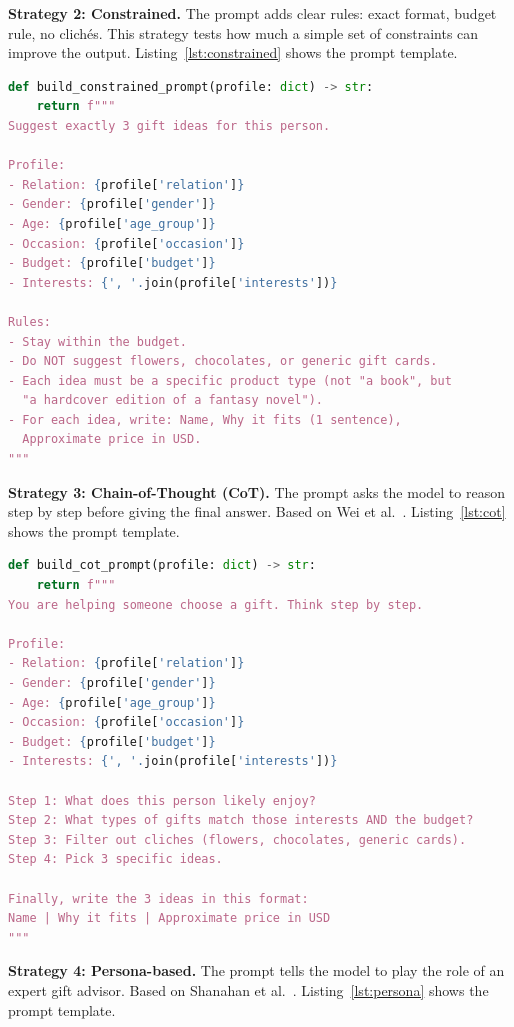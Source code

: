 \textbf{Strategy 2: Constrained.} The prompt adds clear rules: exact format, budget rule, no clichés. This strategy tests how much a simple set of constraints can improve the output. Listing~\ref{lst:constrained} shows the prompt template.

\begin{lstlisting}[language=Python, caption={Constrained prompt template.}, label={lst:constrained}]
def build_constrained_prompt(profile: dict) -> str:
    return f"""
Suggest exactly 3 gift ideas for this person.

Profile:
- Relation: {profile['relation']}
- Gender: {profile['gender']}
- Age: {profile['age_group']}
- Occasion: {profile['occasion']}
- Budget: {profile['budget']}
- Interests: {', '.join(profile['interests'])}

Rules:
- Stay within the budget.
- Do NOT suggest flowers, chocolates, or generic gift cards.
- Each idea must be a specific product type (not "a book", but
  "a hardcover edition of a fantasy novel").
- For each idea, write: Name, Why it fits (1 sentence),
  Approximate price in USD.
"""
\end{lstlisting}

\textbf{Strategy 3: Chain-of-Thought (CoT).} The prompt asks the model to reason step by step before giving the final answer. Based on Wei et al.~\cite{wei2022chain}. Listing~\ref{lst:cot} shows the prompt template.

\begin{lstlisting}[language=Python, caption={Chain-of-Thought prompt template.}, label={lst:cot}]
def build_cot_prompt(profile: dict) -> str:
    return f"""
You are helping someone choose a gift. Think step by step.

Profile:
- Relation: {profile['relation']}
- Gender: {profile['gender']}
- Age: {profile['age_group']}
- Occasion: {profile['occasion']}
- Budget: {profile['budget']}
- Interests: {', '.join(profile['interests'])}

Step 1: What does this person likely enjoy?
Step 2: What types of gifts match those interests AND the budget?
Step 3: Filter out cliches (flowers, chocolates, generic cards).
Step 4: Pick 3 specific ideas.

Finally, write the 3 ideas in this format:
Name | Why it fits | Approximate price in USD
"""
\end{lstlisting}

\textbf{Strategy 4: Persona-based.} The prompt tells the model to play the role of an expert gift advisor. Based on Shanahan et al.~\cite{shanahan2023role}. Listing~\ref{lst:persona} shows the prompt template.

